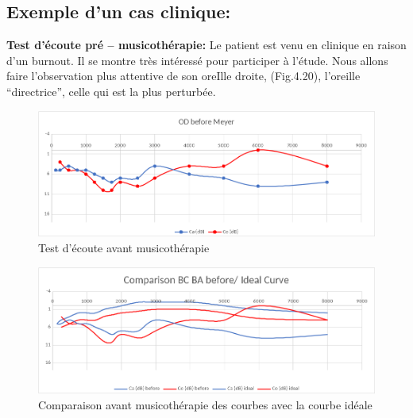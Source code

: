 \subsection{Exemple d'un cas clinique:}


\textbf{ Test d'écoute pré -- musicothérapie:}
 	Le patient est venu en clinique en raison d'un burnout. Il se montre très
        intéressé pour participer à l'étude. Nous allons faire
        l'observation plus attentive de 
        son oreIlle droite, (Fig.4.20), l'oreille ``directrice'', celle qui est la plus perturbée.
 
 	
 	\begin{figure}[tbh]
 		\centering
 		\includegraphics[width=0.7\linewidth]{images/clinique/od_before_meyer.png}
 		\caption{Test d'écoute avant musicothérapie}
 		\label{fig:odbeforemeyer}
 	\end{figure}
 	

	
 	\begin{figure}
 		\centering
 		\includegraphics[width=0.7\linewidth]{images/clinique/comparison_bc_ba_before_vs_ideal_curve_meyer.png}
 		\caption[Comparaison avec la courbe idéale]{Comparaison avant
                  musicothérapie des
                  courbes  avec la courbe idéale}
 		\label{fig:comparisonbcbabeforevsidealcurvemeyer}
 	\end{figure}


	
 	
